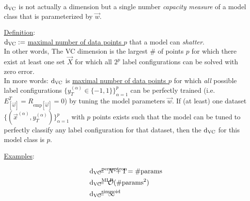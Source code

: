 \begin{frame}\frametitle{\secname}

$\mathrm{d}_{\mathrm{VC}}$ is not actually a dimension but a single number \emph{capacity measure} 
of a model class that is parameterized by $\vec w$.

\underline{Definition}:\\

$\mathrm{d}_{\mathrm{VC}} :=$ \underline{maximal number of data points $p$} that a model can \emph{shatter}.\\

In other words, The VC dimension is the largest \# of points  
$p$ for which there exist at least one set  
$\vec X$ for which all  
$2^p$ label configurations can be solved with zero error.\\

In more words: $\mathrm{d}_{\mathrm{VC}}$ is \underline{maximal number of data points $p$} for which \emph{all} possible label configurations $\{y_{T}^{(\alpha)} \in \{-1,1\}\}_{\alpha=1}^{p}$ can be perfectly trained (i.e. $E^{T}_{[\vec w]} = R_{\text{emp}[\vec w]} = 0$) by tuning the model parameters $\vec w$.
If (at least) one dataset $\{(\vec x^{(\alpha)}, y_{T}^{(\alpha)})\}_{\alpha=1}^{p}$ with $p$ points exists such that the model can be tuned to perfectly classify any label configuration for that dataset, then the $\mathrm{d}_{\mathrm{VC}}$ for this model class is $p$.



\end{frame}

\begin{frame}

\underline{Examples}:

\begin{align}
&{\dvc}^{\text{perceptron}} &\kern-12ex=\;\;& N+1 = \text{\#params}\\
&{\dvc}^{\text{MLP}} &\kern-12ex=\;\;& \mathcal{O}(\text{\#params}^{2})\\
&{\dvc}^{\text{sinusoid}} &\kern-12ex=\;\;& \infty
\end{align}
    
\end{frame}

